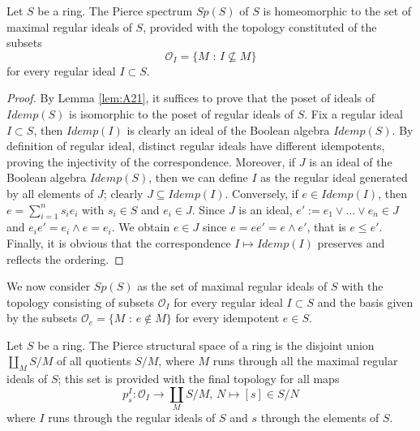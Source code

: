 \begin{lemma}
    Let $S$ be a ring. The Pierce spectrum $Sp(S)$ of $S$ is homeomorphic to the set of maximal regular ideals of $S$, provided with the topology constituted of the subsets
    \[ \mathcal{O}_I = \{M\text{ : }I\not\subseteq M\} \]
    for every regular ideal $I\subset S$.
    \begin{proof}
         By Lemma \ref{lem:A21}, it suffices to prove that the poset of ideals of $Idemp(S)$ is isomorphic to the poset of regular ideals of $S$. Fix a regular ideal $I\subset S$, then $Idemp(I)$ is clearly an ideal of the Boolean algebra $Idemp(S)$. By definition of regular ideal, distinct regular ideals have different idempotents, proving the injectivity of the correspondence. Moreover, if $J$ is an ideal of the Boolean algebra $Idemp(S)$, then we can define $I$ as the regular ideal generated by all elements of $J$; clearly $J\subseteq Idemp(I)$. Conversely, if $e\in Idemp(I)$, then $e=\sum_{i=1}^n s_i e_i$ with $s_i\in S$ and $e_i\in J$. Since $J$ is an ideal, $e':=e_1\vee \dots \vee e_n\in J$ and $e_ie'=e_i\wedge e=e_i$. We obtain $e\in J$ since $e=ee'=e\wedge e'$, that is $e\leq e'$. Finally, it is obvious that the correspondence $I\longmapsto Idemp(I)$ preserves and reflects the ordering.
    \end{proof}
\end{lemma}

We now consider $Sp(S)$ as the set of maximal regular ideals of $S$ with the topology consisting of subsets $\mathcal{O}_I$ for every regular ideal $I\subset S$ and the basis given by the subsets $\mathcal{O}_e=\{M\text{ : }e\not\in M\}$ for every idempotent $e\in S$.

\begin{definition}
    Let $S$ be a ring. The Pierce structural space of a ring is the disjoint union $\coprod_MS/M$ of all quotients $S/M$, where $M$ runs through all the maximal regular ideals of $S$; this set is provided with the final topology for all maps
    \[ p_s^I:\mathcal{O}_I\longrightarrow \coprod_M S/M\text{, }N\longmapsto [s]\in S/N \]
    where $I$ runs through the regular ideals of $S$ and $s$ through the elements of $S$.
\end{definition}

